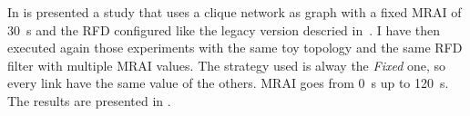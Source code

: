 %	

%
%	
%
%
%

In  is presented a study that uses a clique
network as graph with a fixed \ac{MRAI} of \SI{30}{\second} and the \ac{RFD}
configured like the legacy version descried in~\cite{rfc2439}.
I have then executed again those experiments with the same toy topology and the
same \ac{RFD} filter with multiple \ac{MRAI} values.
The strategy used is alway the \textit{Fixed} one, so every link have the same
value of the others.
\ac{MRAI} goes from \SI{0}{\second} up to \SI{120}{\second}.
The results are presented in .

